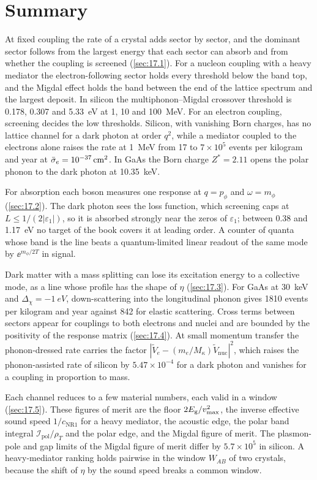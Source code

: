 \section*{Summary}

At fixed coupling the rate of a crystal adds sector by sector, and the dominant sector follows from the largest energy that each sector can absorb and from whether the coupling is screened (\cref{sec:17.1}). For a nucleon coupling with a heavy mediator the electron-following sector holds every threshold below the band top, and the Migdal effect holds the band between the end of the lattice spectrum and the largest deposit. In silicon the multiphonon--Migdal crossover threshold is 0.178, 0.307 and \SI{5.33}{eV} at 1, 10 and \SI{100}{MeV}. For an electron coupling, screening decides the low thresholds. Silicon, with vanishing Born charges, has no lattice channel for a dark photon at order $q^2$, while a mediator coupled to the electrons alone raises the rate at \SI{1}{MeV} from 17 to $7\times10^5$ events per kilogram and year at $\bar{\sigma}_{e} = \SI{e-37}{cm^2}$. In GaAs the Born charge $Z^* = 2.11$ opens the polar phonon to the dark photon at \SI{10.35}{keV}.

For absorption each boson measures one response at $q = p_\phi$ and $\omega = m_\phi$ (\cref{sec:17.2}). The dark photon sees the loss function, which screening caps at $L \le 1/(2|\varepsilon_1|)$, so it is absorbed strongly near the zeros of $\varepsilon_1$; between 0.38 and \SI{1.17}{eV} no target of the book covers it at leading order. A counter of quanta whose band is the line beats a quantum-limited linear readout of the same mode by $\ee^{m_\phi/2T}$ in signal.

Dark matter with a mass splitting can lose its excitation energy to a collective mode, as a line whose profile has the shape of $\eta$ (\cref{sec:17.3}). For GaAs at \SI{30}{keV} and $\Delta_\chi = -\SI{1}{eV}$, down-scattering into the longitudinal phonon gives 1810 events per kilogram and year against 842 for elastic scattering. Cross terms between sectors appear for couplings to both electrons and nuclei and are bounded by the positivity of the response matrix (\cref{sec:17.4}). At small momentum transfer the phonon-dressed rate carries the factor $|\tilde V_e - (m_e/M_\kappa)\tilde V_{\mathrm{nuc}}|^2$, which raises the phonon-assisted rate of silicon by $5.47\times10^{-4}$ for a dark photon and vanishes for a coupling in proportion to mass.

Each channel reduces to a few material numbers, each valid in a window (\cref{sec:17.5}). These figures of merit are the floor $2E_{\mathrm{g}}/v_{\mathrm{max}}^2$, the inverse effective sound speed $1/c_{\mathrm{NR1}}$ for a heavy mediator, the acoustic edge, the polar band integral $\mathcal{I}_{\mathrm{pol}}/\rho_T$ and the polar edge, and the Migdal figure of merit. The plasmon-pole and gap limits of the Migdal figure of merit differ by $5.7\times10^5$ in silicon. A heavy-mediator ranking holds pairwise in the window $W_{AB}$ of two crystals, because the shift of $\eta$ by the sound speed breaks a common window.

